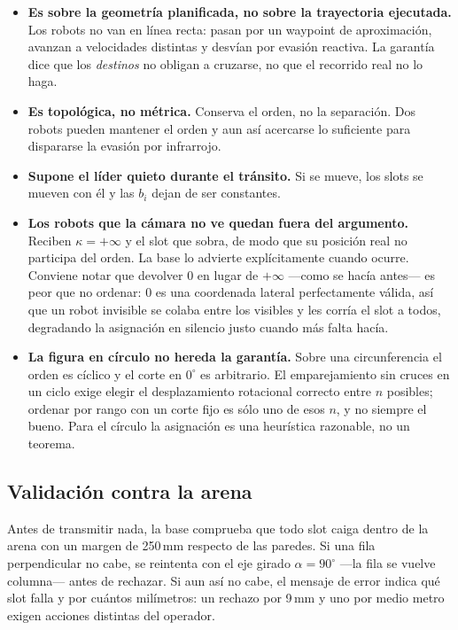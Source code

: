 \documentclass[11pt,a4paper]{article}
\theoremstyle{plain}
\begin{document}
\begin{itemize}
  \item \textbf{Es sobre la geometría planificada, no sobre la trayectoria
    ejecutada.} Los robots no van en línea recta: pasan por un waypoint de
    aproximación, avanzan a velocidades distintas y desvían por evasión
    reactiva. La garantía dice que los \emph{destinos} no obligan a cruzarse,
    no que el recorrido real no lo haga.
  \item \textbf{Es topológica, no métrica.} Conserva el orden, no la
    separación. Dos robots pueden mantener el orden y aun así acercarse lo
    suficiente para dispararse la evasión por infrarrojo.
  \item \textbf{Supone el líder quieto durante el tránsito.} Si se mueve, los
    slots se mueven con él y las $b_i$ dejan de ser constantes.
  \item \textbf{Los robots que la cámara no ve quedan fuera del argumento.}
    Reciben $\kappa = +\infty$ y el slot que sobra, de modo que su posición
    real no participa del orden. La base lo advierte explícitamente cuando
    ocurre. Conviene notar que devolver $0$ en lugar de $+\infty$ ---como se
    hacía antes--- es peor que no ordenar: $0$ es una coordenada lateral
    perfectamente válida, así que un robot invisible se colaba entre los
    visibles y les corría el slot a todos, degradando la asignación en
    silencio justo cuando más falta hacía.
  \item \textbf{La figura en círculo no hereda la garantía.} Sobre una
    circunferencia el orden es cíclico y el corte en $0^\circ$ es arbitrario.
    El emparejamiento sin cruces en un ciclo exige elegir el desplazamiento
    rotacional correcto entre $n$ posibles; ordenar por rango con un corte fijo
    es sólo uno de esos $n$, y no siempre el bueno. Para el círculo la
    asignación es una heurística razonable, no un teorema.
\end{itemize}

\subsection{Validación contra la arena}

Antes de transmitir nada, la base comprueba que todo slot caiga dentro de la
arena con un margen de 250\,mm respecto de las paredes. Si una fila
perpendicular no cabe, se reintenta con el eje girado $\alpha = 90^\circ$
---la fila se vuelve columna--- antes de rechazar. Si aun así no cabe, el
mensaje de error indica qué slot falla y por cuántos milímetros: un rechazo por
9\,mm y uno por medio metro exigen acciones distintas del operador.
\end{document}
